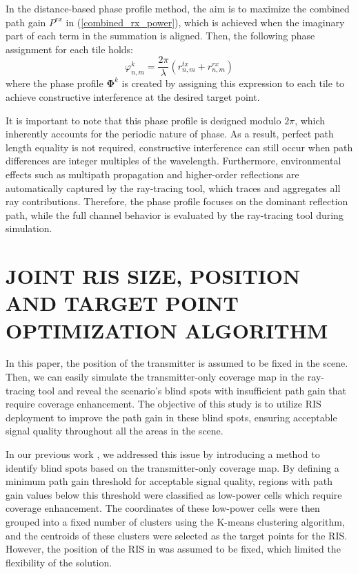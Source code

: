 \documentclass{IEEEoj}
\begin{document}
In the distance-based phase profile method, the aim is to maximize the combined path gain $P^{rx}$ in (\ref{combined_rx_power}), which is achieved when the imaginary part of each term in the summation is aligned. Then, the following phase assignment for each tile holds:
\begin{equation}
	\varphi_{n,m}^k = \frac{2 \pi}{\lambda} (r_{n,m}^{tx} + r_{n,m}^{rx})
\end{equation}
where the phase profile $\mathbf{\Phi}^k$ is created by assigning this expression to each tile to achieve constructive interference at the desired target point.

It is important to note that this phase profile is designed modulo $2\pi$, which inherently accounts for the periodic nature of phase. As a result, perfect path length equality is not required, constructive interference can still occur when path differences are integer multiples of the wavelength. Furthermore, environmental effects such as multipath propagation and higher-order reflections are automatically captured by the ray-tracing tool, which traces and aggregates all ray contributions. Therefore, the phase profile focuses on the dominant reflection path, while the full channel behavior is evaluated by the ray-tracing tool during simulation.

\section{JOINT RIS SIZE, POSITION AND TARGET POINT OPTIMIZATION ALGORITHM} \label{algo_section}
In this paper, the position of the transmitter is assumed to be fixed in the scene. Then, we can easily simulate the transmitter-only coverage map in the ray-tracing tool and reveal the scenario's blind spots with insufficient path gain that require coverage enhancement. The objective of this study is to utilize RIS deployment to improve the path gain in these blind spots, ensuring acceptable signal quality throughout all the areas in the scene.

In our previous work \cite{emre_claude_eucap_paper}, we addressed this issue by introducing a method to identify blind spots based on the transmitter-only coverage map. By defining a minimum path gain threshold for acceptable signal quality, regions with path gain values below this threshold were classified as low-power cells which require coverage enhancement. The coordinates of these low-power cells were then grouped into a fixed number of clusters using the K-means clustering algorithm, and the centroids of these clusters were selected as the target points for the RIS. However, the position of the RIS in \cite{emre_claude_eucap_paper} was assumed to be fixed, which limited the flexibility of the solution.
\end{document}
